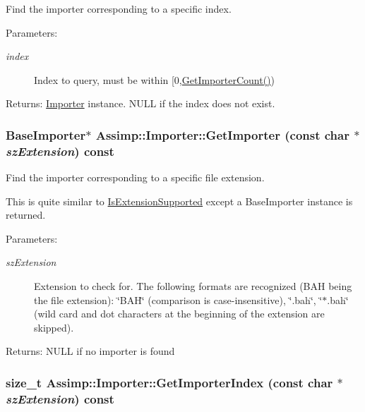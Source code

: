 Find the importer corresponding to a specific index.

\begin{Desc}
\item[Parameters:]
\begin{description}
\item[{\em index}]Index to query, must be within \mbox{[}0,\hyperlink{class_assimp_1_1_importer_fe982451f1a1c9b0b59c788f9329ccc1}{GetImporterCount()}) \end{description}
\end{Desc}
\begin{Desc}
\item[Returns:]\hyperlink{class_assimp_1_1_importer}{Importer} instance. NULL if the index does not exist. \end{Desc}
\hypertarget{class_assimp_1_1_importer_18921ab411273fa95961f60848ad6007}{
\subsubsection[GetImporter]{\setlength{\rightskip}{0pt plus 5cm}BaseImporter$\ast$ Assimp::Importer::GetImporter (const char $\ast$ {\em szExtension}) const}}
\label{class_assimp_1_1_importer_18921ab411273fa95961f60848ad6007}


Find the importer corresponding to a specific file extension.

This is quite similar to \hyperlink{class_assimp_1_1_importer_9146ea75c33c0aac0310195346877388}{IsExtensionSupported} except a BaseImporter instance is returned. \begin{Desc}
\item[Parameters:]
\begin{description}
\item[{\em szExtension}]Extension to check for. The following formats are recognized (BAH being the file extension): \char`\"{}BAH\char`\"{} (comparison is case-insensitive), \char`\"{}.bah\char`\"{}, \char`\"{}$\ast$.bah\char`\"{} (wild card and dot characters at the beginning of the extension are skipped). \end{description}
\end{Desc}
\begin{Desc}
\item[Returns:]NULL if no importer is found \end{Desc}
\hypertarget{class_assimp_1_1_importer_ee103460f66b9cbe3143400ec92ffc56}{
\subsubsection[GetImporterIndex]{\setlength{\rightskip}{0pt plus 5cm}size\_\-t Assimp::Importer::GetImporterIndex (const char $\ast$ {\em szExtension}) const}}
\label{class_assimp_1_1_importer_ee103460f66b9cbe3143400ec92ffc56}


